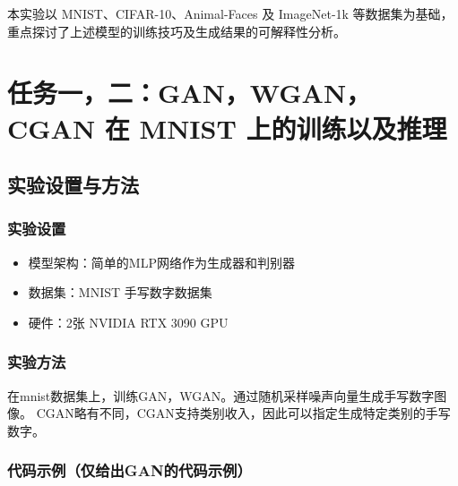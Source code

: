 \documentclass[12pt, a4paper]{article}
\begin{document}
本实验以 MNIST、CIFAR-10、Animal-Faces 及 ImageNet-1k 等数据集为基础，重点探讨了上述模型的训练技巧及生成结果的可解释性分析。
\newpage
\tableofcontents

\newpage
\section{任务一，二：GAN，WGAN，CGAN 在 MNIST 上的训练以及推理}
\subsection{实验设置与方法}
\subsubsection{实验设置}
\begin{itemize}
    \item 模型架构：简单的MLP网络作为生成器和判别器
    \item 数据集：MNIST 手写数字数据集
    \item 硬件：2张 NVIDIA RTX 3090 GPU 
\end{itemize}

\subsubsection{实验方法}
在mnist数据集上，训练GAN，WGAN。通过随机采样噪声向量生成手写数字图像。
CGAN略有不同，CGAN支持类别收入，因此可以指定生成特定类别的手写数字。

\subsubsection{代码示例（仅给出GAN的代码示例）}
\end{document}
